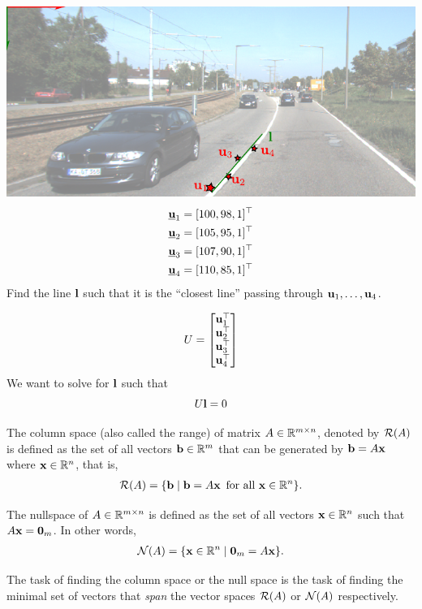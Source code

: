 \documentclass[times,t]{beamer}
\begin{document}
\newcommand{\ubfu}{\underline{\bfu}}
\begin{frame}
  \includegraphics[width=\linewidth]{media/lane-from-points.pdf}
  \begin{align*}
    \ubfu_1 &= [100, 98, 1]^\top\\
    \ubfu_2 &= [105, 95, 1]^\top\\
    \ubfu_3 &= [107, 90, 1]^\top\\
    \ubfu_4 &= [110, 85, 1]^\top
    \end{align*}
    Find  the line $\mathbf{l}$ such that it is the ``closest line'' passing through
    $\mathbf{u}_1, \dots, \mathbf{u}_4$.
\end{frame}

\begin{frame}
  \[
  U = \begin{bmatrix}\mathbf{u}_1^\top  \\
    \mathbf{u}_2^\top \\
    \mathbf{u}_3^\top \\
    \mathbf{u}_4^\top
  \end{bmatrix}
  \]
  We want to solve for $\mathbf{l}$ such that
  \[
    U \mathbf{l} = 0
  \]
\end{frame}


\begin{frame}

  The column space (also called the  range) of matrix $A \in \mathbb{R}^{m \times n}$, denoted by ${\cal R}(A)$ is defined
  as the set of all vectors $\mathbf{b} \in \mathbb{R}^m$ that can be generated by $\mathbf{b} = A\mathbf{x}$
  where $\mathbf{x} \in \mathbb{R}^n$, that is,
  \begin{align}
    {\cal R}(A) = \{ \mathbf{b} \mid \mathbf{b} = A\mathbf{x}\,\text{ for all } \mathbf{x} \in \mathbb{R}^n\}.
  \end{align}

  The nullspace of $A \in \mathbb{R}^{m \times n}$ is defined as the set of all vectors
  $\mathbf{x} \in \mathbb{R}^n$ such that $A\mathbf{x} = \boldsymbol{0}_m$. In other words,
  \begin{align}
    {\cal N}(A) = \{ \mathbf{x} \in \mathbb{R}^n \mid \boldsymbol{0}_m = A\mathbf{x} \}.
  \end{align}

  The task  of finding  the column space or the   null  space is the task  of
  finding the minimal set  of  vectors  that  \textit{span}   the vector  spaces
  ${\cal R}(A)$  or ${\cal N}(A)$ respectively.
\end{frame}
\end{document}
